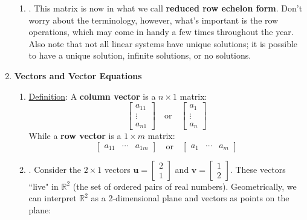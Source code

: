 \documentclass[12pt]{article}
\begin{document}
\begin{enumerate}
\begin{enumerate}
	\item\underline{}.
		This matrix is now in what we call \textbf{reduced row echelon form}. Don't worry about the terminology, however,
		what's important is the row operations, which may come in handy a few times throughout the year. Also note
		that not all linear systems have unique solutions; it is possible to have a unique solution, infinite solutions,
		or no solutions.
	\end{enumerate}

\newpage

\item\textbf{Vectors and Vector Equations}
	\begin{enumerate}
	\item\underline{Definition}: A \textbf{column vector} is a $n\times 1$ matrix: 
			\[\begin{bmatrix}
				a_{11} \\
				\vdots \\
				a_{n1}
			\end{bmatrix}
			\quad\text{or}\quad
			\begin{bmatrix}
				a_{1} \\
				\vdots \\
				a_{n}
			\end{bmatrix}\]
		While a \textbf{row vector} is a $1\times m$ matrix:
			\[\begin{bmatrix}
				a_{11} &
				\cdots &
				a_{1m}
			\end{bmatrix}
			\quad\text{or}\quad
			\begin{bmatrix}
				a_{1} &
				\cdots &
				a_{m}
			\end{bmatrix}\]

	\item\underline{}.
		Consider the $2\times 1$ vectors $\mathbf{u}=\begin{bmatrix}2 \\ 1\end{bmatrix}$ and $\mathbf{v}=\begin{bmatrix}1 \\ 2\end{bmatrix}$.
		These vectors ``live" in $\mathbb{R}^2$ (the set of ordered pairs of real numbers). Geometrically, we can interpret $\mathbb{R}^2$
		as a 2-dimensional plane and vectors as points on the plane: 
		\begin{center}
		\end{center}
	

\end{enumerate}
\end{enumerate}
\end{document}
